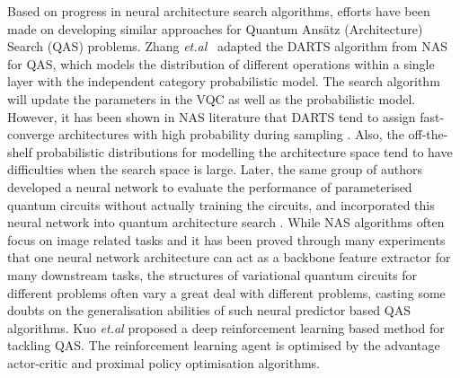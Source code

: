 \documentclass[a4paper,onecolumn,11pt]{quantumarticle}
\begin{document}
Based on progress in neural architecture search algorithms, efforts have been made on developing similar approaches for Quantum Ans\"atz (Architecture) Search (QAS) problems. Zhang \textit{et.al}~\cite{zhang2021differentiable} adapted the DARTS algorithm \cite{DARTS_DBLP:conf/iclr/LiuSY19} from NAS for QAS, which models the distribution of different operations within a single layer with the independent category probabilistic model. The search algorithm will update the parameters in the VQC as well as the probabilistic model. However, it has been shown in NAS literature that DARTS tend to assign fast-converge architectures with high probability during sampling \cite{Shu2019-jf, Zhou2020-dg}. Also, the off-the-shelf probabilistic distributions for modelling the architecture space tend to have difficulties when the search space is large. Later, the same group of authors developed a neural network to evaluate the performance of parameterised quantum circuits without actually training the circuits, and incorporated this neural network into quantum architecture search \cite{zhang2021neural}. While NAS algorithms often focus on image related tasks and it has been proved through many experiments that one neural network architecture can act as a backbone feature extractor for many downstream tasks, the structures of variational quantum circuits for different problems often vary a great deal with different problems, casting some doubts on the generalisation abilities of such neural predictor based QAS algorithms. Kuo \textit{et.al} \cite{kuo2021quantum} proposed a deep reinforcement learning based method for tackling QAS. The reinforcement learning agent is optimised by the advantage actor-critic and proximal policy optimisation algorithms. 
\end{document}
